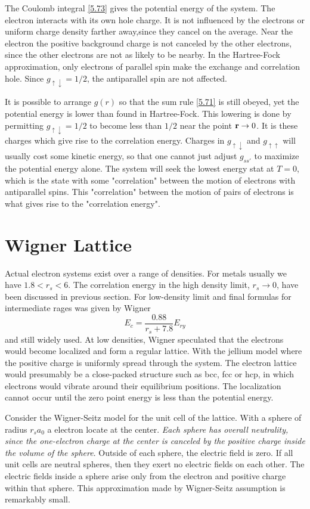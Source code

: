 The Coulomb integral \eqref{5.73} gives the potential energy of the system.
The electron interacts with its own hole charge.
It is not influenced by the electrons or uniform charge density farther away,since they cancel on the average.
Near the electron the positive background charge is not canceled by the other electrons, since the other electrons are not as likely to be nearby.
In the Hartree-Fock approximation, only electrons of parallel spin make the exchange and correlation hole.
Since $g_{\uparrow\downarrow}=1/2$, the antiparallel spin are not affected.

It is possible to arrange $g(r)$ so that the sum rule \eqref{5.71} is still obeyed, yet the potential energy is lower than found in Hartree-Fock.
This lowering is done by permitting $g_{\uparrow\downarrow}=1/2$ to become less than $1/2$ near the point $\mathbf{r} \to 0$.
It is these charges which give rise to the correlation energy.
Charges in $g_{\uparrow\downarrow}$ and $g_{\uparrow\uparrow}$ will usually cost some kinetic energy, so that one cannot just adjust $g_{ss'}$ to maximize the potential energy alone.
The system will seek the lowest energy stat at $T=0$, which is the state with some "correlation" between the motion of electrons  with antiparallel spins.
This "correlation" between the motion of pairs of electrons is what gives rise to the "correlation energy".

\section{Wigner Lattice}\label{s5.2}
Actual electron systems exist over a range of densities.
For metals usually we have $1.8<r_s<6$.
The correlation energy in the high density limit, $r_s\to 0$, have been discussed in previous section.
For low-density limit and final formulas for intermediate rages was given by Wigner
\begin{equation}
    E_c = \frac{0.88}{r_s + 7.8} E_{ry} \label{5.74}
\end{equation}
and still widely used.
At low densities, Wigner speculated that the electrons would become localized and form a regular lattice.
With the jellium model where the positive charge is uniformly spread through the system.
The electron lattice would presumably be a close-packed structure such as bcc, fcc or hcp, in which electrons would vibrate around their equilibrium positions.
The localization cannot occur until the zero point energy is less than the potential energy.

Consider the Wigner-Seitz model for the unit cell of the lattice.
With a sphere of radius $r_s a_0$ a electron locate at the center.
\textit{Each sphere has overall neutrality, since the one-electron charge at the center is canceled by the positive charge inside the volume of the sphere}.
Outside of each sphere, the electric field is zero.
If all unit cells are neutral spheres, then they exert no electric fields on each other.
The electric fields inside a sphere arise only from the electron and positive charge within that sphere.
This approximation made by Wigner-Seitz assumption is remarkably small.

